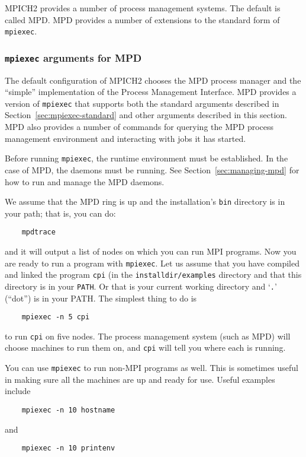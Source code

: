 \documentclass[dvipdfm,11pt]{article}
\begin{document}
MPICH2 provides a number of process management systems.  The default is
called MPD.  MPD provides a number of extensions to the standard form of
\texttt{mpiexec}.

\subsubsection{\texttt{mpiexec} arguments for MPD}
\label{sec:extensions-mpd}

The default configuration of MPICH2 chooses the MPD process manager and
the ``simple'' implementation of the Process Management Interface.
MPD provides a version of
\texttt{mpiexec} that supports both the standard arguments described in
Section~\ref{sec:mpiexec-standard} and other arguments described in this
section.  MPD also provides a number of commands for querying the MPD
process management environment and interacting with jobs it has started. 

Before running \texttt{mpiexec}, the runtime environment must be
established.  In the case of MPD, the daemons must be running.  See
Section~\ref{sec:managing-mpd} for how to run and manage the MPD daemons.

We assume that the MPD ring is up and the installation's \texttt{bin}
directory is in your path; that is, you can do:
\begin{verbatim}
    mpdtrace
\end{verbatim}
and it will output a list of nodes on which you can run MPI programs.
Now you are ready to run a program with \texttt{mpiexec}.  Let us assume
that you have compiled and linked the program \texttt{cpi} (in the
\texttt{installdir/examples} directory and that this directory is in your
\texttt{PATH}.  Or that is your current working directory and
`\texttt{.}' (``dot'') is in your PATH.   The simplest thing to do is
\begin{verbatim}
    mpiexec -n 5 cpi
\end{verbatim}
to run \texttt{cpi} on five nodes.  The process management system (such
as MPD) will choose machines to run them on, and \texttt{cpi} will tell
you where each is running.  

You can use \texttt{mpiexec} to run non-MPI programs as well.  This is
sometimes useful in making sure all the machines are up and ready for
use.  Useful examples include
\begin{verbatim}
    mpiexec -n 10 hostname
\end{verbatim}
and
\begin{verbatim}
    mpiexec -n 10 printenv
\end{verbatim}
\end{document}

